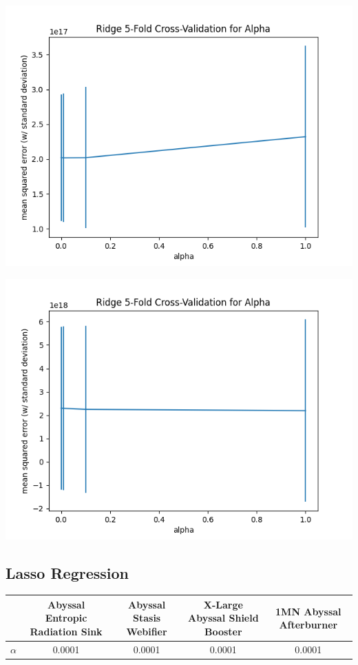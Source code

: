 \documentclass[10pt]{article}
\begin{document}
\begin{minipage}{0.9\linewidth}
			\begin{minipage}{0.35\linewidth}
				\includegraphics[width=\linewidth]{../graphs/afterburner_ridge_alpha_crossval.png}
			\end{minipage}%
			\begin{minipage}{0.35\linewidth}
				\includegraphics[width=\linewidth]{../graphs/entropic_radiation_sink_ridge_alpha_crossval.png}
			\end{minipage}
		\end{minipage}
	\subsection{Lasso Regression}
		\begin{tabular}{|c|c|c|c|c|}
			\hline
			& Abyssal Entropic Radiation Sink & Abyssal Stasis Webifier & X-Large Abyssal Shield Booster & 1MN Abyssal Afterburner\\
			\hline
			$\alpha$ & 0.0001 & 0.0001 & 0.0001 & 0.0001\\
			\hline
		\end{tabular}
		
\end{document}
